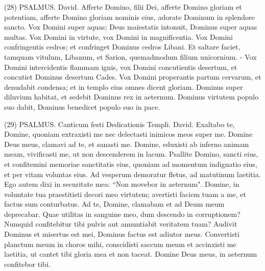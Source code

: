 \begin{biblechapter}  (28) 
\verse  PSALMUS. David. Afferte Domino, filii Dei, afferte Domino gloriam et potentiam, 
\verse afferte Domino gloriam nominis eius, adorate Dominum in splendore sancto. 
\verse Vox Domini super aquas; Deus maiestatis intonuit, Dominus super aquas multas. 
\verse Vox Domini in virtute, vox Domini in magnificentia. 
\verse Vox Domini confringentis cedros; et confringet Dominus cedros Libani. 
\verse Et saltare faciet, tamquam vitulum, Libanum, et Sarion, quemadmodum filium unicornium. - 
\verse Vox Domini intercidentis flammam ignis, 
\verse vox Domini concutientis desertum, et concutiet Dominus desertum Cades. 
\verse Vox Domini properantis partum cervarum, et denudabit condensa; et in templo eius omnes dicent gloriam. 
\verse Dominus super diluvium habitat, et sedebit Dominus rex in aeternum. 
\verse Dominus virtutem populo suo dabit, Dominus benedicet populo suo in pace. 
\end{biblechapter}

\begin{biblechapter}  (29) 
\verse  PSALMUS. Canticum festi Dedicationis Templi. David. 
\verse Exaltabo te, Domine, quoniam extraxisti me nec delectasti inimicos meos super me. 
\verse Domine Deus meus, clamavi ad te, et sanasti me. 
\verse Domine, eduxisti ab inferno animam meam, vivificasti me, ut non descenderem in lacum. 
\verse Psallite Domino, sancti eius, et confitemini memoriae sanctitatis eius, 
\verse quoniam ad momentum indignatio eius, et per vitam voluntas eius. Ad vesperum demoratur fletus, ad matutinum laetitia. 
\verse Ego autem dixi in securitate mea: “Non movebor in aeternum". 
\verse Domine, in voluntate tua praestitisti decori meo virtutem; avertisti faciem tuam a me, et factus sum conturbatus. 
\verse Ad te, Domine, clamabam et ad Deum meum deprecabar. 
\verse Quae utilitas in sanguine meo, dum descendo in corruptionem? Numquid confitebitur tibi pulvis aut annuntiabit veritatem tuam? 
\verse Audivit Dominus et misertus est mei, Dominus factus est adiutor meus. 
\verse Convertisti planctum meum in choros mihi, conscidisti saccum meum et accinxisti me laetitia, 
\verse ut cantet tibi gloria mea et non taceat. Domine Deus meus, in aeternum confitebor tibi. 
\end{biblechapter}

